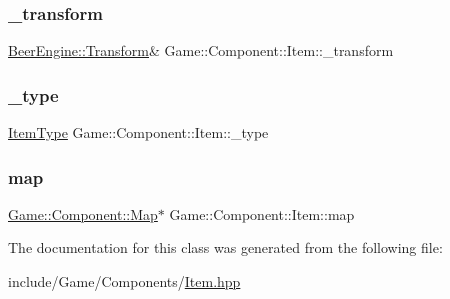 \subsubsection{\texorpdfstring{\+\_\+transform}{\_transform}}
{\footnotesize\ttfamily \mbox{\hyperlink{class_beer_engine_1_1_transform}{Beer\+Engine\+::\+Transform}}\& Game\+::\+Component\+::\+Item\+::\+\_\+transform}

\mbox{\label{class_game_1_1_component_1_1_item_a4cb117bf44cb719e75921b7a4489646d}} 
\subsubsection{\texorpdfstring{\+\_\+type}{\_type}}
{\footnotesize\ttfamily \mbox{\hyperlink{namespace_game_1_1_component_a95e2dc2d86d1c4789cc068f51d59ec29}{Item\+Type}} Game\+::\+Component\+::\+Item\+::\+\_\+type}

\mbox{\label{class_game_1_1_component_1_1_item_a4c483cc36f7f36b79cf1d0e13cd73afc}} 
\subsubsection{\texorpdfstring{map}{map}}
{\footnotesize\ttfamily \mbox{\hyperlink{class_game_1_1_component_1_1_map}{Game\+::\+Component\+::\+Map}}$\ast$ Game\+::\+Component\+::\+Item\+::map}



The documentation for this class was generated from the following file\+:\begin{DoxyCompactItemize}
\item 
include/\+Game/\+Components/\mbox{\hyperlink{_item_8hpp}{Item.\+hpp}}\end{DoxyCompactItemize}
